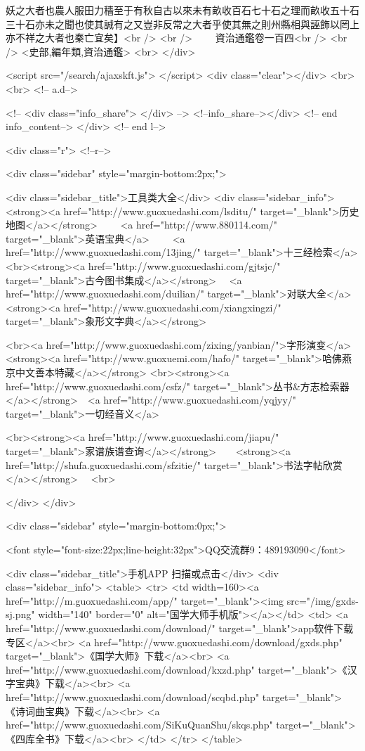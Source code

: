 妖之大者也農人服田力穡至于有秋自古以來未有畝收百石七十石之理而畝收五十石三十石亦未之聞也使其誠有之又豈非反常之大者乎使其無之則州縣相與誣飾以罔上亦不祥之大者也秦亡宜矣】<br />
<br />
　　資治通鑑卷一百四<br />
<br />
<史部,編年類,資治通鑑>  <br>
   </div> 

<script src="/search/ajaxskft.js"> </script>
 <div class="clear"></div>
<br>
<br>
 <!-- a.d-->

 <!--
<div class="info_share">
</div> 
-->
 <!--info_share--></div>   <!-- end info_content-->
  </div> <!-- end l-->

<div class="r">   <!--r-->



<div class="sidebar"  style="margin-bottom:2px;">

 
<div class="sidebar_title">工具类大全</div>
<div class="sidebar_info">
<strong><a href="http://www.guoxuedashi.com/lsditu/" target="_blank">历史地图</a></strong>　　
<a href="http://www.880114.com/" target="_blank">英语宝典</a>　　
<a href="http://www.guoxuedashi.com/13jing/" target="_blank">十三经检索</a>　
<br><strong><a href="http://www.guoxuedashi.com/gjtsjc/" target="_blank">古今图书集成</a></strong>　
<a href="http://www.guoxuedashi.com/duilian/" target="_blank">对联大全</a>　<strong><a href="http://www.guoxuedashi.com/xiangxingzi/" target="_blank">象形文字典</a></strong>　

<br><a href="http://www.guoxuedashi.com/zixing/yanbian/">字形演变</a>　　<strong><a href="http://www.guoxuemi.com/hafo/" target="_blank">哈佛燕京中文善本特藏</a></strong>
<br><strong><a href="http://www.guoxuedashi.com/csfz/" target="_blank">丛书&方志检索器</a></strong>　<a href="http://www.guoxuedashi.com/yqjyy/" target="_blank">一切经音义</a>　　

<br><strong><a href="http://www.guoxuedashi.com/jiapu/" target="_blank">家谱族谱查询</a></strong>　　<strong><a href="http://shufa.guoxuedashi.com/sfzitie/" target="_blank">书法字帖欣赏</a></strong>　
<br>

</div>
</div>


<div class="sidebar" style="margin-bottom:0px;">

<font style="font-size:22px;line-height:32px">QQ交流群9：489193090</font>


<div class="sidebar_title">手机APP 扫描或点击</div>
<div class="sidebar_info">
<table>
<tr>
	<td width=160><a href="http://m.guoxuedashi.com/app/" target="_blank"><img src="/img/gxds-sj.png" width="140"  border="0" alt="国学大师手机版"></a></td>
	<td>
<a href="http://www.guoxuedashi.com/download/" target="_blank">app软件下载专区</a><br>
<a href="http://www.guoxuedashi.com/download/gxds.php" target="_blank">《国学大师》下载</a><br>
<a href="http://www.guoxuedashi.com/download/kxzd.php" target="_blank">《汉字宝典》下载</a><br>
<a href="http://www.guoxuedashi.com/download/scqbd.php" target="_blank">《诗词曲宝典》下载</a><br>
<a href="http://www.guoxuedashi.com/SiKuQuanShu/skqs.php" target="_blank">《四库全书》下载</a><br>
</td>
</tr>
</table>

